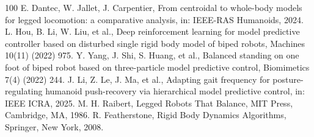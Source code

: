 ﻿\documentclass[preprint,12pt]{elsarticle}
\begin{document}
\begin{thebibliography}{100}
 E. Dantec, W. Jallet, J. Carpentier, From centroidal to whole-body models for legged locomotion: a comparative analysis, in: IEEE-RAS Humanoids, 2024.
 L. Hou, B. Li, W. Liu, et al., Deep reinforcement learning for model predictive controller based on disturbed single rigid body model of biped robots, Machines 10(11) (2022) 975.
 Y. Yang, J. Shi, S. Huang, et al., Balanced standing on one foot of biped robot based on three-particle model predictive control, Biomimetics 7(4) (2022) 244.
 J. Li, Z. Le, J. Ma, et al., Adapting gait frequency for posture-regulating humanoid push-recovery via hierarchical model predictive control, in: IEEE ICRA, 2025.
 M. H. Raibert, Legged Robots That Balance, MIT Press, Cambridge, MA, 1986.
 R. Featherstone, Rigid Body Dynamics Algorithms, Springer, New York, 2008.
\end{thebibliography}
\end{document}
